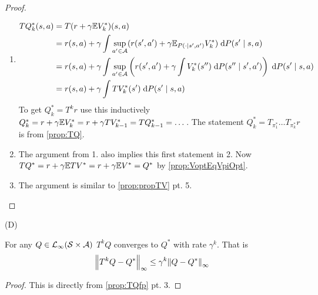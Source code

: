 \begin{proof}
  \leavevmode
  \begin{enumerate}
    \item \begin{align*}
	TQ^*_k(s,a) &= T(r + \gamma \mathbb{E} V^*_k)(s,a)
	\\ &= r(s,a) + \gamma
	\int \sup_{a' \in \mathcal{A}} (r(s',a')
	+ \gamma \mathbb{E}_{P(\cdot \mid s', a')} V^*_k)
	\; \mathrm{d} P(s' \mid s,a)
	\\ &=r(s,a) + \gamma
	\int \sup_{a' \in \mathcal{A}} \left(r(s',a') + \gamma
	\int V_k^*(s'') \; \mathrm{d} P(s'' \mid s', a') \right)
	\; \mathrm{d} P(s' \mid s,a)
	\\ &= r(s, a) + \gamma
	\int T V^*_k(s') \; \mathrm{d} P(s' \mid s, a)
      \end{align*}
      To get $Q^*_k = T^k r$ use this inductively
      $Q^*_k = r + \gamma \mathbb{E} V^*_k = r+ \gamma TV^*_{k-1}
      = T Q^*_{k-1} = \dots$.
      The statement $Q^*_k = T_{\pi^*_1} \dots T_{\pi^*_k} r$
      is from \cref{prop:TQ}.
    \item The argument from 1. also implies this first statement in
      2. Now $TQ^* = r + \gamma \mathbb{E} TV^* = r + \gamma \mathbb{E} V^* = Q^*$
      by \cref{prop:VoptEqVpiOpt}.
    \item The argument is similar to \cref{prop:propTV} pt. 5.
  \end{enumerate}
\end{proof}

\begin{cor} (D)

  For any $Q \in \mathcal{L}_\infty(\mathcal{S} \times \mathcal{A})$
  $T^k Q$ converges to $Q^*$ with rate $\gamma^k$.
  That is
  \[ \norm{T^k Q - Q^*}_\infty \leq \gamma^k \norm{Q - Q^*}_\infty \]
  \label{cor:QrateSimple}
\end{cor}
\begin{proof}
  This is directly from \cref{prop:TQfp} pt. 3.
\end{proof}

